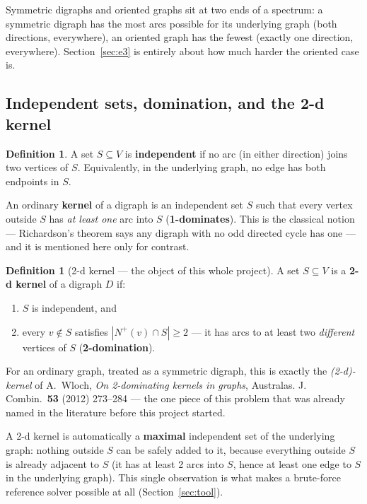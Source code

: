 \documentclass[11pt]{article}
\theoremstyle{plain}
\theoremstyle{definition}
\newtheorem{definition}[theorem]{Definition}
\theoremstyle{remark}
\begin{document}
Symmetric digraphs and oriented graphs sit at two ends of a spectrum: a symmetric
digraph has the most arcs possible for its underlying graph (both directions,
everywhere), an oriented graph has the fewest (exactly one direction, everywhere).
Section~\ref{sec:e3} is entirely about how much harder the oriented case is.

\subsection{Independent sets, domination, and the 2-d kernel}

\begin{definition}
A set $S \subseteq V$ is \textbf{independent} if no arc (in either direction) joins two
vertices of $S$. Equivalently, in the underlying graph, no edge has both endpoints in
$S$.
\end{definition}

An ordinary \textbf{kernel} of a digraph is an independent set $S$ such that every
vertex outside $S$ has \emph{at least one} arc into $S$ (\textbf{1-dominates}). This is
the classical notion — Richardson's theorem says any digraph with no odd directed
cycle has one — and it is mentioned here only for contrast.

\begin{definition}[2-d kernel — the object of this whole project]
A set $S \subseteq V$ is a \textbf{2-d kernel} of a digraph $D$ if:
\begin{enumerate}[nosep]
\item $S$ is independent, and
\item every $v \notin S$ satisfies $|N^+(v) \cap S| \ge 2$ — it has arcs to at least
two \emph{different} vertices of $S$ (\textbf{2-domination}).
\end{enumerate}
For an ordinary graph, treated as a symmetric digraph, this is exactly the
\emph{(2-d)-kernel} of A.~Wloch, \emph{On 2-dominating kernels in graphs}, Australas.
J. Combin.\ \textbf{53} (2012) 273--284 — the one piece of this problem that was
already named in the literature before this project started.
\end{definition}

A 2-d kernel is automatically a \textbf{maximal} independent set of the underlying
graph: nothing outside $S$ can be safely added to it, because everything outside $S$
is already adjacent to $S$ (it has at least 2 arcs into $S$, hence at least one edge
to $S$ in the underlying graph). This single observation is what makes a
brute-force reference solver possible at all (Section~\ref{sec:tool}).
\end{document}
